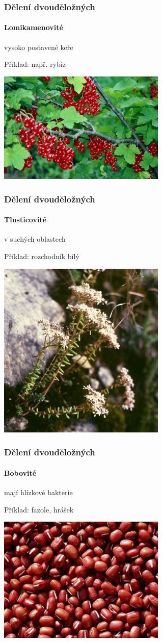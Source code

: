 \documentclass{beamer}
\begin{document}
\begin{frame}
\frametitle{Dělení dvouděložných}
	\framesubtitle{Lomikamenovité}vysoko postavené keře

Příklad: např. rybíz

\begin{center}\includegraphics[width=8cm]{Cerveny_rybiz.jpg}\end{center}
\end{frame}
\begin{frame}
\frametitle{Dělení dvouděložných}
	\framesubtitle{Tlusticovité}v suchých oblastech

Příklad: rozchodník bílý

\begin{center}\includegraphics[width=8cm]{Sedum_album.jpg}\end{center}
\end{frame}
\begin{frame}
\frametitle{Dělení dvouděložných}
	\framesubtitle{Bobovité}mají hlízkové bakterie

Příklad: fazole, hrášek

\begin{center}\includegraphics[width=8cm]{258px-W_azuki2111.jpg}\end{center}
\end{frame}
\end{document}
